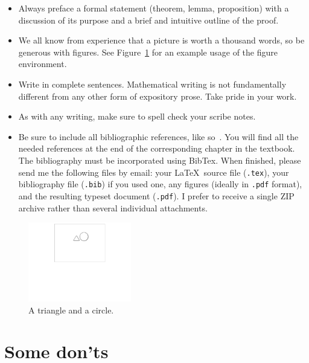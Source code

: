 \documentclass[usletter]{article}
\begin{document}
\begin{itemize}
\item Always preface a formal statement (theorem,
lemma, proposition) with a discussion of its purpose
and a brief and intuitive outline of the proof.

\item We all know from experience that a picture is
worth a thousand words, so be generous with figures. See
Figure~\ref{fig:triangle-circle} for an example usage
of the figure environment. 

\item Write in complete sentences.  Mathematical
writing is not fundamentally different from any other
form of expository prose. Take pride in your work. 

\item As with any writing, make sure to spell check
your scribe notes. 

\item Be sure to include all bibliographic references,
like so~\cite{textbook}. You will find all the needed
references at the end of the corresponding chapter in the
textbook. The bibliography must be incorporated using
BibTex.  When finished, please send me the following
files by email: your \LaTeX\ source file ({\tt .tex}),
your bibliography file ({\tt .bib}) if you used one,
any figures (ideally in {\tt .pdf} format), and the
resulting typeset document ({\tt .pdf}).   I prefer to
receive a single ZIP archive rather than several
individual attachments.
\end{itemize}

\begin{figure}
\begin{center}
\includegraphics[width=0.4\textwidth]{triangle-circle}
\end{center}
\caption{A triangle and a circle.}
\label{fig:triangle-circle}
\end{figure}

\section{Some don'ts}
\end{document}

